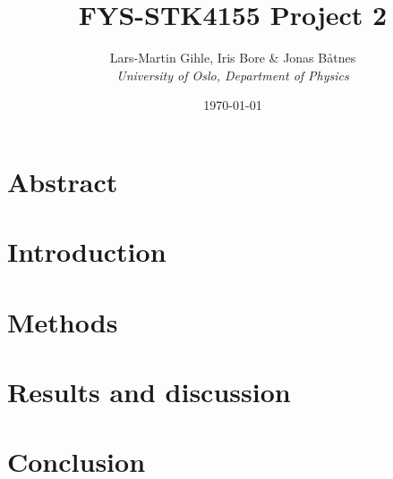 \documentclass[12pt,a4paper,english,nofootinbib,sort&compress,numbers]{revtex4-2} %
\begin{document}
\title{FYS-STK4155 Project 2 \\ }       
\author{Lars-Martin Gihle, Iris Bore \& Jonas Båtnes   \\ \textit{University of Oslo, Department of Physics}}        %
\date{\today}                  %


\noaffiliation                 %

\begin{abstract}
    
\end{abstract}

\maketitle

\section{Abstract}
%
\label{sec:Abstract}


\newpage
\section{Introduction}
%
\label{sec:introduction}


\newpage
\section{Methods}\label{sec:methods}
%
\label{sec:methods}



\newpage
\section{Results and discussion}\label{sec:results_and_discussion}
%
\label{sec:results}


\newpage
\section{Conclusion}\label{sec:conclusion}
%
\label{sec:conclusion}

\end{document}
